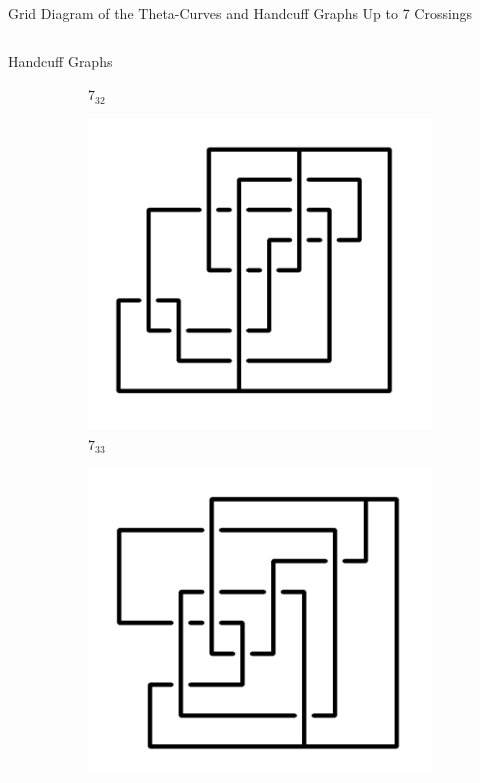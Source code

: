 \documentclass[final]{beamer}
\begin{document}
\begin{frame}[t]
\begin{alertblock}{Grid Diagram of the Theta-Curves and Handcuff Graphs Up to 7 Crossings}
\begin{columns}[t]
\begin{column}{0.5\textwidth}
\begin{alertblock}{Handcuff Graphs}
\begin{figure}
\begin{subfigure}{0.075\textwidth}
    \caption{$7_{32}$} 
    \end{subfigure}
    \begin{subfigure}{0.075\textwidth}
    \includegraphics[width=\columnwidth]{../Midterm_Poster/grid_diagram/handcuff_7_33.png}
    \caption{$7_{33}$} 
    \end{subfigure}
    \begin{subfigure}{0.075\textwidth}
    \includegraphics[width=\columnwidth]{../Midterm_Poster/grid_diagram/handcuff_7_34.png}

\end{subfigure}
\end{figure}
\end{alertblock}
\end{column}
\end{columns}
\end{alertblock}
\end{frame}
\end{document}

